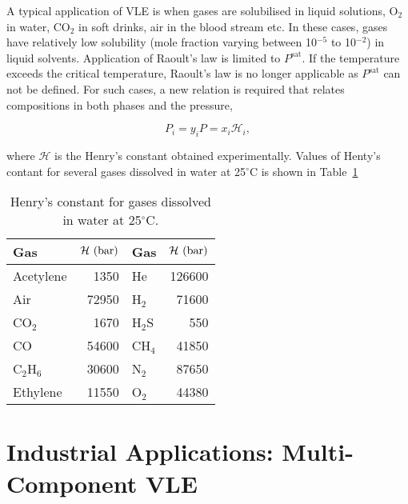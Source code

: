A typical application of VLE is when gases are solubilised in liquid solutions, \eg O$_{2}$ in water, CO$_{2}$ in soft drinks, air in the blood stream etc. In these cases, gases have relatively low solubility (mole fraction varying between 10$^{-5}$ to 10$^{-2}$) in liquid solvents. Application of Raoult's law is limited to $P^{\text{sat}}$. If the temperature exceeds the critical temperature, Raoult's law is no longer applicable as $P^{\text{sat}}$ can not be defined. For such cases, a new relation is required that relates compositions in both phases and the pressure,
\begin{shaded}
  \begin{equation}
      P_{i} = y_{i}P = x_{i}\mathcal{H}_{i},\label{Chapter:VLE:PartialMolarProperties:HenryLaw} 
  \end{equation}
\end{shaded}
\noindent where $\mathcal{H}$ is the Henry's constant obtained experimentally. Values of Henty's contant for several gases dissolved in water at 25$^{\circ}$C is shown in Table~\ref{Chapter:VLE:PartialMolarProperties:HenryLawTable}
 \begin{table}
  \begin{center}
    \begin{tabular}{l r || l r }
      \hline
       {\bf Gas}    &  ${\bf \mathcal{H}\text{ (bar)}}$ & {\bf Gas}    &  ${\bf \mathcal{H}\text{ (bar)}}$ \\
      \hline
         Acetylene  &   1350                            & He           &  126600 \\
         Air        &   72950                           & H$_{2}$      &  71600  \\
         CO$_{2}$    & 1670                              & H$_{2}$S     & 550 \\
         CO         &  54600                            &  CH$_{4}$    &  41850 \\
         C$_{2}$H$_{6}$ & 30600                          &  N$_{2}$     & 87650  \\
         Ethylene  & 11550                              & O$_{2}$      & 44380 \\
      \hline
    \end{tabular}
    \caption{Henry's constant for gases dissolved in water at 25$^{\circ}$C.}\label{Chapter:VLE:PartialMolarProperties:HenryLawTable}
  \end{center}
\end{table}

  
\section{Industrial Applications: Multi-Component VLE}

